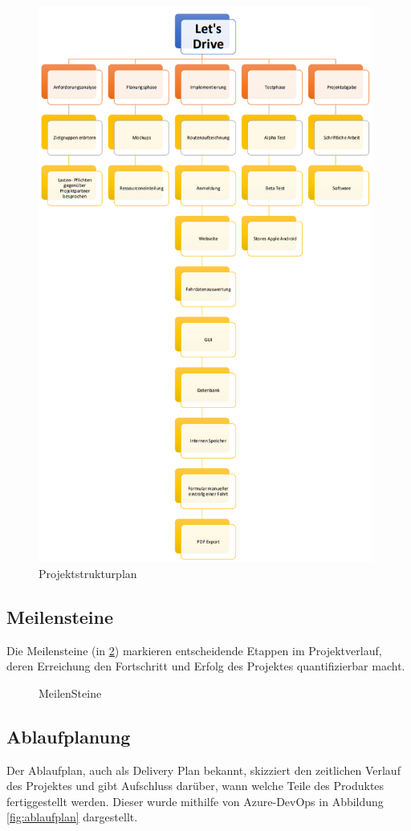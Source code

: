 \begin{figure}[H]
	\centering
	\includegraphics[width=11cm]{figures/ProjektStrukturPlan.png}
	\caption{Projektstrukturplan}
	\label{fig:projektstrukturplan}
\end{figure}

\subsection{Meilensteine}
Die Meilensteine (in \ref{fig:meilensteine}) markieren entscheidende Etappen im Projektverlauf, deren Erreichung den Fortschritt und Erfolg des Projektes quantifizierbar macht.

\begin{figure}[H]
	\centering
	\caption{MeilenSteine}
	\label{fig:meilensteine}
\end{figure}

\subsection{Ablaufplanung}
Der Ablaufplan, auch als Delivery Plan bekannt, skizziert den zeitlichen Verlauf des Projektes und gibt Aufschluss darüber, wann welche Teile des Produktes fertiggestellt werden. Dieser wurde mithilfe von Azure-DevOps in Abbildung \ref{fig:ablaufplan} dargestellt.

